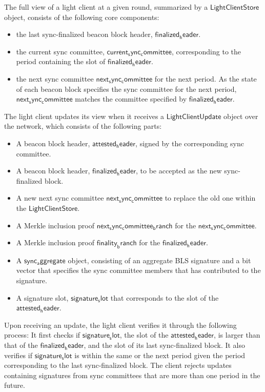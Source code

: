 The full view of a light client at a given round, summarized by a $\mathsf{LightClientStore}$ object, 
consists of the following core components:
\begin{itemize}
    \item the last sync-finalized beacon block header, $\mathsf{finalized_header}$.
    \item the current sync committee, $\mathsf{current_sync_committee}$, corresponding to the period
    containing the slot of $\mathsf{finalized_header}$.
    \item the next sync committee $\mathsf{next_sync_committee}$ for the next period. 
    As the state of each beacon block specifies the sync committee for the next period,
    $\mathsf{next_sync_committee}$ matches the committee specified by $\mathsf{finalized_header}$. 
\end{itemize}

The light client updates its view when it receives a $\mathsf{LightClientUpdate}$ object over the network, 
which consists of the following parts: 
\begin{itemize}
    \item A beacon block header, $\mathsf{attested_header}$, signed by the corresponding sync committee.
    \item A beacon block header, $\mathsf{finalized_header}$, to be accepted as the new sync-finalized block.
    \item A new next sync committee $\mathsf{next_sync_committee}$ to replace the old one within the $\mathsf{LightClientStore}$.
    \item A Merkle inclusion proof $\mathsf{next_sync_committee_branch}$ for the $\mathsf{next_sync_committee}$.
    \item A Merkle inclusion proof $\mathsf{finality_branch}$ for the $\mathsf{finalized_header}$.
    \item A $\mathsf{sync_aggregate}$ object, consisting of an aggregate BLS signature and a bit vector that specifies
    the sync committee members that has contributed to the signature.
    \item A signature slot, $\mathsf{signature_slot}$ that corresponds to the slot of the $\mathsf{attested_header}$.
\end{itemize}

Upon receiving an update, the light client verifies it through the following process:
It first checks if $\mathsf{signature_slot}$, the slot of the $\mathsf{attested_header}$,
is larger than that of the $\mathsf{finalized_header}$, and the slot of its last sync-finalized block.
It also verifies if $\mathsf{signature_slot}$ is within the same or the next period given the period 
corresponding to the last sync-finalized block.
The client rejects updates containing signatures from sync committees that are more than one period in the future.


